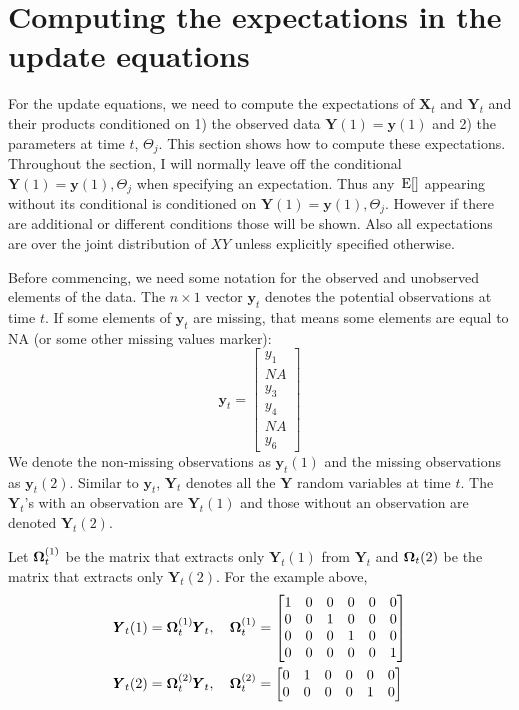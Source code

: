 \documentclass[]{article}
\def\OMG{\mbox{\boldmath $\Omega$}}
\def\E{\,\textup{\textrm{E}}}
\def\XX{\mbox{$\pmb{X}$}}	\def\xx{\mbox{$\pmb{x}$}}
\def\YY{\mbox{$\pmb{Y}$}}	\def\yy{\mbox{$\pmb{y}$}}
\begin{document}
\section{Computing the expectations in the update equations}\label{sec:compexpectations}
For the update equations, we need to compute the expectations of $\XX_t$ and $\YY_t$ and their products conditioned on 1) the observed data $\YY(1)=\yy(1)$ and 2) the parameters at time $t$, $\Theta_j$.  This section shows how to compute these expectations.  Throughout the section, I will normally leave off the conditional $\YY(1)=\yy(1),\Theta_j$ when specifying an expectation. Thus any $\E[ ]$ appearing without its conditional is conditioned on $\YY(1)=\yy(1),\Theta_j$.  However if there are additional or different conditions those will be shown.  Also all expectations are over the joint distribution of $XY$ unless explicitly specified otherwise.

Before commencing, we need some notation for the observed and unobserved elements of the data.
The $n \times 1$ vector $\yy_t$ denotes the potential observations at time $t$. If some elements of $\yy_t$ are missing, that means some elements are equal to NA (or some other missing values marker):
\begin{equation}
\yy_t=\begin{bmatrix}
y_1\\
NA\\
y_3\\
y_4\\
NA\\
y_6
\end{bmatrix}
\end{equation}
We denote the non-missing observations as $\yy_t(1)$ and the missing observations as $\yy_t(2)$.  Similar to $\yy_t$, $\YY_t$ denotes all the $\YY$ random variables at time $t$.  The $\YY_t$'s with an observation are  $\YY_t(1)$ and those without an observation are denoted $\YY_t(2)$. 

Let $\OMG_t^{(1)}$ be the matrix that extracts only $\YY_t(1)$ from $\YY_t$ and $\OMG_t(2)$ be the matrix that extracts only $\YY_t(2)$.  For the example above,
\begin{equation}
\begin{split}
&\YY_t(1)=\OMG_t^{(1)} \YY_t,\quad \OMG_t^{(1)} = 
\begin{bmatrix}
1&0&0&0&0&0\\
0&0&1&0&0&0\\
0&0&0&1&0&0\\
0&0&0&0&0&1\\
\end{bmatrix}\\
&\YY_t(2)=\OMG_t^{(2)} \YY_t,\quad \OMG_t^{(2)} = 
\begin{bmatrix}
0&1&0&0&0&0\\
0&0&0&0&1&0
\end{bmatrix}
\end{split}
\end{equation}
\end{document}
